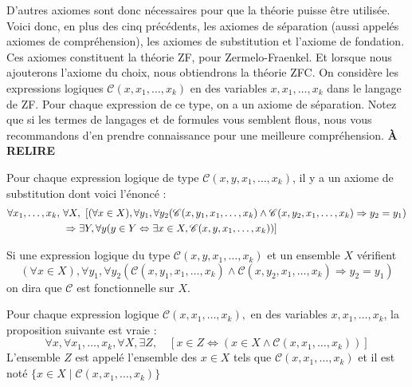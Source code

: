 D'autres axiomes sont donc nécessaires pour que la théorie puisse être utilisée. Voici donc, en plus des cinq précédents, les axiomes de séparation (aussi appelés axiomes de compréhension),
les axiomes de substitution et l'axiome de fondation. Ces axiomes constituent la théorie ZF, pour Zermelo-Fraenkel. Et lorsque nous ajouterons l'axiome du choix, nous obtiendrons la théorie ZFC.
On considère les expressions logiques $\mathscr{C}(x,x_1,\dotsc ,x_k)$ en des variables $x,x_1,\dotsc ,x_k$
dans le langage de ZF. Pour chaque expression de ce type, on a un axiome de séparation.
Notez que si les termes de langages et de formules vous semblent flous, nous vous recommandons d'en prendre connaissance pour une meilleure compréhension.
\textbf{À RELIRE}
\begin{axiome}\label{ens : axiome : remplacement}
	Pour chaque expression logique de type $\mathscr{C}(x, y,x_1,\dotsc , x_k)$, il y a un axiome de substitution dont voici l'énoncé :
	\begin{align*}
		 \forall x_1,\dots, x_k,\ &\forall X, \ [(\forall x\in X), \forall y_1, \forall y_2 (\mathscr{C}(x, y_1,x_1,\dotsc, x_k)\land \mathscr{C}(x, y_2, x_1, \dotsc , x_k)\Rightarrow y_2 = y_1)\\
        & \Rightarrow \exists Y, \forall y (y\in Y \Leftrightarrow \exists x\in X, \mathscr{C}(x, y,x_1, \dotsc ,x_k))]
	\end{align*}
\end{axiome}
\begin{notation}
    Si une expression logique du type $\mathscr{C}(x, y,x_1,\dotsc , x_k)$ et un ensemble $X$ vérifient $$(\forall x\in X), \forall y_1, \forall y_2 (\mathscr{C}(x, y_1,x_1,\dotsc, x_k)\land \mathscr{C}(x, y_2, x_1, \dotsc , x_k)\Rightarrow y_2 = y_1)$$ on dira que $\mathscr{C}$ est fonctionnelle sur $X$. 
\end{notation}
\begin{proposition}\label{ens : axiome : séparation}
	Pour chaque expression logique $\mathscr{C}(x,x_1,\dotsc ,x_k),$ en des variables $x,x_1,\dotsc ,x_k$, la proposition suivante est vraie :
	\begin{equation*}
		\forall x,\forall x_1,\dotsc, x_k,\forall X,\exists Z, \quad [x\in Z \Leftrightarrow (x\in X \land \mathscr{C}(x,x_1,\dotsc , x_k) )]
	\end{equation*}
	L'ensemble $Z$ est appelé l'ensemble des $x\in X$ tels que $\mathscr{C}(x,x_1,\dotsc , x_k)$ et il est noté $\{x\in X \mid \mathscr{C}(x,x_1,\dots, x_k)\}$
\end{proposition}
